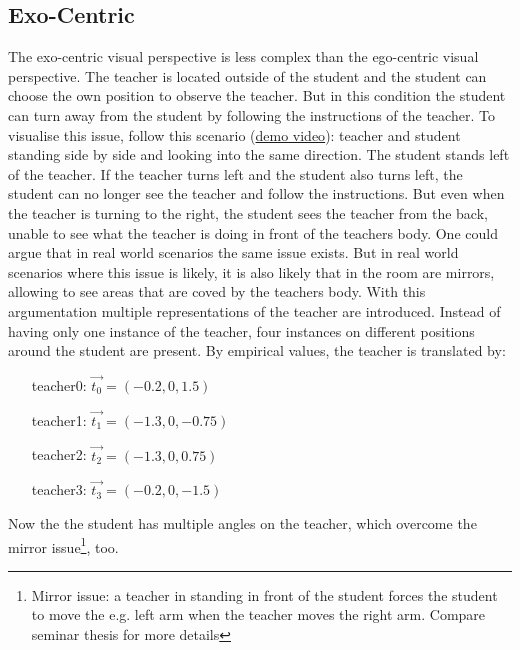 \subsection{Exo-Centric}
The exo-centric visual perspective is less complex than the ego-centric visual perspective. The teacher is located outside of the student and the student can choose the own position to observe the teacher. But in this condition the student can turn away from the student by following the instructions of the teacher. To visualise this issue, follow this scenario (\href{https://www.youtube.com/watch?v=mRG22RBXKTM&feature=youtu.be}{demo video}): teacher and student standing side by side and looking into the same direction. The student stands left of the teacher. If the teacher turns left and the student also turns left, the student can no longer see the teacher and follow the instructions. But even when the teacher is turning to the right, the student sees the teacher from the back, unable to see what the teacher is doing in front of the teachers body. One could argue that in real world scenarios the same issue exists. But in real world scenarios where this issue is likely, it is also likely that in the room are mirrors, allowing to see areas that are coved by the teachers body. With this argumentation multiple representations of the teacher are introduced. Instead of having only one instance of the teacher, four instances on different positions around the student are present. By empirical values, the teacher is translated by:
\begin{itemize}
	\centering
	\item[teacher0:] $\vec{t_0} = (-0.2,0,1.5)$
	\item[teacher1:] $\vec{t_1} = (-1.3,0,-0.75)$
	\item[teacher2:] $\vec{t_2} = (-1.3,0,0.75)$
	\item[teacher3:] $\vec{t_3} = (-0.2,0,-1.5)$
\end{itemize}

Now the the student has multiple angles on the teacher, which overcome the mirror issue\footnote{Mirror issue: a teacher in standing in front of the student forces the student to move the e.g. left arm when the teacher moves the right arm. Compare seminar thesis for more details}, too.
